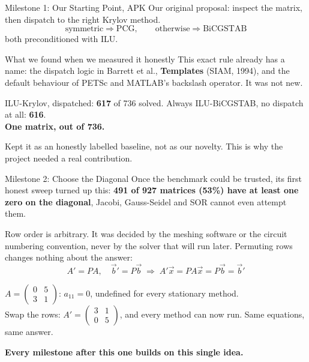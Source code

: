 \documentclass[aspectratio=169,10pt]{beamer}
\renewcommand{\emph}[1]{{\color{LSteal}\bfseries #1}}
\newcommand{\bad}[1]{{\color{LSred}\bfseries #1}}
\begin{document}
\begin{frame}{Milestone 1: Our Starting Point, APK}
  \small
  Our original proposal: inspect the matrix, then dispatch to the right Krylov
  method.
  \[ \text{symmetric} \Rightarrow \text{PCG}, \qquad \text{otherwise} \Rightarrow \text{BiCGSTAB} \]
  both preconditioned with ILU.
  \vspace{0.4em}
  \begin{block}{\small What we found when we measured it honestly}
    \footnotesize This exact rule already has a name: the dispatch logic in
    Barrett et al., \emph{Templates} (SIAM, 1994), and the default behaviour of
    PETSc and MATLAB's backslash operator. It was not new.
  \end{block}
  \vspace{0.4em}
  \begin{center}
  \colorbox{LSlightgold}{\parbox{0.92\linewidth}{\centering\small
  ILU-Krylov, dispatched: \textbf{617} of 736 solved.\quad
  Always ILU-BiCGSTAB, no dispatch at all: \textbf{616}.\\[0.2em]
  \bad{One matrix, out of 736.}}}
  \end{center}
  \vspace{0.3em}
  \footnotesize\color{LSgray}
  Kept it as an honestly labelled baseline, not as our novelty. This is why the
  project needed a real contribution.
\end{frame}

\begin{frame}{Milestone 2: Choose the Diagonal}
  \small
  Once the benchmark could be trusted, its first honest sweep turned up this:
  \textbf{491 of 927 matrices (53\%) have at least one zero on the diagonal},
  Jacobi, Gauss-Seidel and SOR cannot even attempt them.
  \vspace{0.5em}

  Row order is arbitrary. It was decided by the meshing software or the circuit
  numbering convention, never by the solver that will run later. Permuting rows
  changes nothing about the answer:
  \[ A' = PA,\quad \vec{b}' = P\vec{b} \;\Rightarrow\; A'\vec{x} = PA\vec{x} = P\vec{b} = \vec{b}' \]
  \vspace{0.4em}
  \begin{center}
  \colorbox{LSlightgold}{\parbox{0.85\linewidth}{\centering\footnotesize
  $A = \begin{pmatrix}0 & 5\\ 3 & 1\end{pmatrix}$: $a_{11}{=}0$, undefined for every
  stationary method.\\
  Swap the rows: $A' = \begin{pmatrix}3 & 1\\ 0 & 5\end{pmatrix}$, and every method
  can now run. Same equations, same answer.}}
  \end{center}
  \vspace{0.5em}
  \footnotesize
  \textbf{\color{LSteal}Every milestone after this one builds on this single idea.}
\end{frame}
\end{document}
